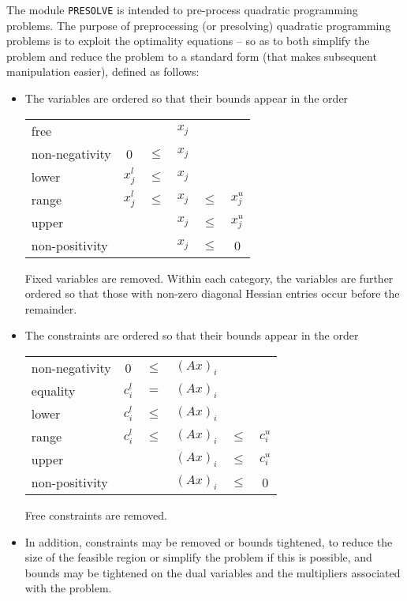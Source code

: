\documentclass[twoside]{article}
\begin{document}
The module {\tt PRESOLVE} is intended to pre-process
quadratic programming problems.
The purpose of preprocessing (or presolving)
quadratic programming problems is to exploit the
optimality equations -- so as to both simplify the problem
and reduce the problem to a standard form (that makes subsequent
manipulation easier), defined as follows:
\begin{itemize}
\item The variables are ordered so that their bounds appear in the order
\begin{center}
\begin{tabular}{lccccc}
free                &          &        & $x_j$ &        &          \\
non-negativity      &   0      & $\leq$ & $x_j$ &        &          \\
lower               & $x^l_j$ & $\leq$ & $x_j$ &        &          \\
range               & $x^l_j$ & $\leq$ & $x_j$ & $\leq$ & $x^u_j$ \\
upper               &          &        & $x_j$ & $\leq$ & $x^u_j$ \\
non-positivity      &          &        & $x_j$ & $\leq$ &      0   \\
\end{tabular}
\end{center}

Fixed variables are removed. Within each category, the variables
are further ordered so that those with non-zero diagonal Hessian
entries occur before the remainder.

\item
The constraints are ordered so that their bounds appear in the order
\begin{center}
\begin{tabular}{lccccc}
non-negativity      &     0    & $\leq$ & $( A x)_i$ &        &          \\
equality            & $c^l_i$ &   $=$  & $(A x)_i$ &        &          \\
lower               & $c^l_i$ & $\leq$ & $(A x)_i$ &        &          \\
range               & $c^l_i$ & $\leq$ & $(A x)_i$ & $\leq$ & $c^u_i$ \\
upper               &          &        & $(A x)_i$ & $\leq$ & $c^u_i$ \\
non-positivity      &          &        & $(A x)_i$ & $\leq$ &     0    \\
\end{tabular}
\end{center}
Free constraints are removed.

\item
In addition, constraints may be removed or bounds tightened, to reduce the
size of the feasible region or simplify the problem if this is possible, and
bounds may be tightened on the dual variables and the multipliers
associated  with the problem.
\end{itemize}
\end{document}
